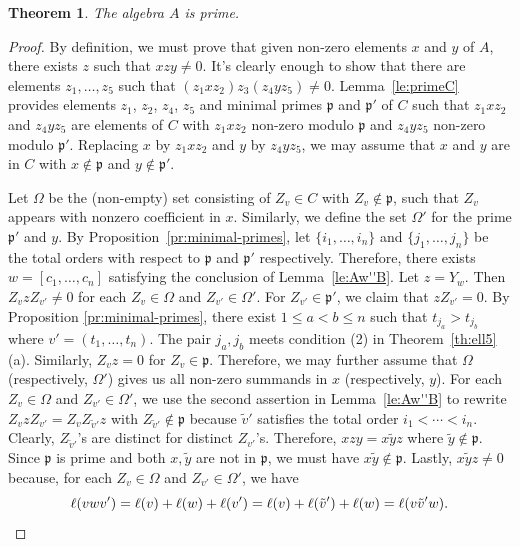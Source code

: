\documentclass[12pt]{amsart}
\renewcommand{\le}{\leqslant}
\newcommand{\mfp}{\mathfrak{p}}
\numberwithin{equation}{section}
\newtheorem{theorem}[equation]{Theorem}
\theoremstyle{definition}
\begin{document}
\begin{theorem}\label{th:prime}
The algebra $A$ is prime.
\end{theorem}
\begin{proof}
By definition, we must prove that given non-zero elements $x$ and $y$
of $A$, there exists $z$ such that $xzy\ne 0$. It's clearly enough to
show that there are elements $z_{1},\dots,z_{5}$ such that
$(z_{1}xz_{2})z_{3}(z_{4}yz_{5})\ne 0$.
Lemma~\ref{le:primeC} provides elements $z_1$, $z_2$, $z_4$, $z_5$
and minimal primes $\mfp$ and $\mfp'$ of $C$ 
such that $z_1xz_2$ and $z_4yz_5$  are elements of $C$ with
$z_1xz_2$ non-zero modulo $\mfp$ and $z_4yz_5$ non-zero modulo $\mfp'$.
Replacing $x$ by $z_1xz_2$ and $y$ by $z_4yz_5$, we may assume that
$x$ and $y$ are in $C$ with $x\not\in\mfp$ and $y\not\in\mfp'$.


Let $\Omega$ be the (non-empty) set consisting of $Z_v\in C$ with
$Z_v\not\in \mfp$, such that $Z_v$ appears with nonzero coefficient in $x$. Similarly,
we define the set $\Omega'$ for the prime $\mfp'$ and $y$. By
Proposition~\ref{pr:minimal-primes}, let $\{i_1,\ldots,i_n\}$ and
$\{j_1,\ldots,j_n\}$ be the total orders with respect to $\mfp$ and
$\mfp'$ respectively. Therefore, there exists $w=[c_1,\ldots,c_n]$
satisfying the conclusion of Lemma~\ref{le:Aw''B}. Let $z=Y_{w}$. Then
$Z_vzZ_{v'}\ne 0$ for each $Z_v\in \Omega$ and $Z_{v'}\in\Omega'$. For
$Z_{v'}\in\mfp'$, we claim that $zZ_{v'}=0$. By Proposition
\ref{pr:minimal-primes}, there exist $1\le a<b\le n$ such that
$t_{j_a}>t_{j_b}$ where $v'=(t_1,\ldots,t_n)$. The pair $j_a,j_b$
meets condition (2) in Theorem~\ref{th:ell5}(a). Similarly, $Z_vz=0$
for $Z_v\in\mfp$. Therefore, we may further assume that $\Omega$
(respectively, $\Omega'$) gives us all non-zero summands in $x$
(respectively, $y$). For each $Z_v\in \Omega$ and $Z_{v'}\in\Omega'$,
we use the second assertion in Lemma~\ref{le:Aw''B} to rewrite
$Z_vzZ_{v'}=Z_vZ_{\tilde v'}z$ with $Z_{\tilde v'}\not\in \mfp$
because $\tilde v'$ satisfies the total order
$i_1<\cdots<i_n$. Clearly, $Z_{\tilde v'}$'s are distinct for distinct
$Z_{v'}$'s. Therefore, $xzy=x\tilde yz$ where $\tilde
y\not\in\mfp$. Since $\mfp$ is prime and both $x,\tilde y$ are not in
$\mfp$, we must have $x\tilde y\not\in \mfp$. Lastly, $x\tilde yz\ne
0$ because, for each $Z_v\in\Omega$ and $Z_{v'}\in\Omega'$, we
have  
\begin{equation*}
\ell(vwv')=\ell(v)+\ell(w)+\ell(v')=\ell(v)+
\ell(\tilde v')+\ell(w)=\ell(v\tilde v'w).
\qedhere
\end{equation*} 
\end{proof}
\end{document}
